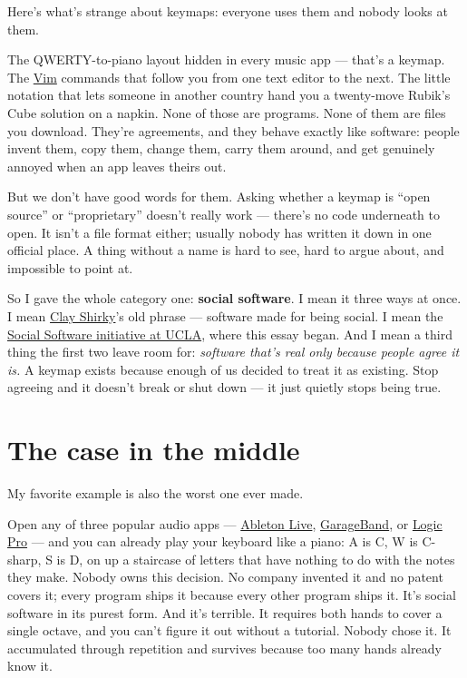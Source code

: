 \documentclass[11pt,letterpaper]{article}
\begin{document}
Here's what's strange about keymaps: everyone uses them and nobody looks at them.

The QWERTY-to-piano layout hidden in every music app --- that's a keymap. The \href{https://www.vim.org}{Vim} commands that follow you from one text editor to the next. The little notation that lets someone in another country hand you a twenty-move Rubik's Cube solution on a napkin. None of those are programs. None of them are files you download. They're agreements, and they behave exactly like software: people invent them, copy them, change them, carry them around, and get genuinely annoyed when an app leaves theirs out.

But we don't have good words for them. Asking whether a keymap is ``open source'' or ``proprietary'' doesn't really work --- there's no code underneath to open. It isn't a file format either; usually nobody has written it down in one official place. A thing without a name is hard to see, hard to argue about, and impossible to point at.

So I gave the whole category one: \textbf{social software}. I mean it three ways at once. I mean \href{https://shirky.com/essays/a-group-is-its-own-worst-enemy/}{Clay Shirky}'s old phrase --- software made for being social. I mean the \href{https://sosoft.arts.ucla.edu}{Social Software initiative at UCLA}, where this essay began. And I mean a third thing the first two leave room for: \textit{software that's real only because people agree it is.} A keymap exists because enough of us decided to treat it as existing. Stop agreeing and it doesn't break or shut down --- it just quietly stops being true.

\section{The case in the middle}

My favorite example is also the worst one ever made.

Open any of three popular audio apps --- \href{https://www.ableton.com/en/live/}{Ableton Live}, \href{https://www.apple.com/mac/garageband/}{GarageBand}, or \href{https://www.apple.com/logic-pro/}{Logic Pro} --- and you can already play your keyboard like a piano: A is C, W is C-sharp, S is D, on up a staircase of letters that have nothing to do with the notes they make. Nobody owns this decision. No company invented it and no patent covers it; every program ships it because every other program ships it. It's social software in its purest form. And it's terrible. It requires both hands to cover a single octave, and you can't figure it out without a tutorial. Nobody chose it. It accumulated through repetition and survives because too many hands already know it.
\end{document}
